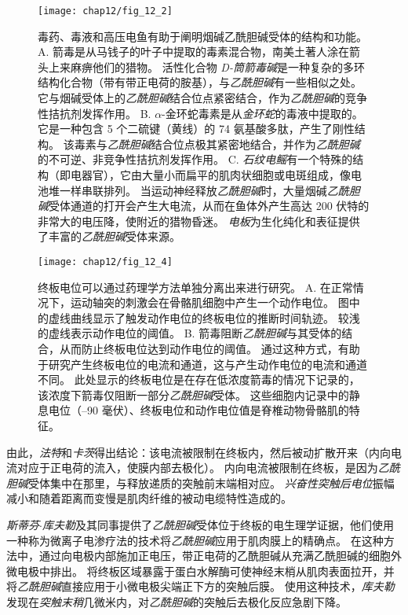 \begin{figure}[htbp]
	\centering
	\texttt{[image: chap12/fig\_12\_2]}
	\caption{毒药、毒液和高压电鱼有助于阐明烟碱乙酰胆碱受体的结构和功能。 
	A. 箭毒是从马钱子的叶子中提取的毒素混合物，南美土著人涂在箭头上来麻痹他们的猎物。
	活性化合物 \textit{D-筒箭毒碱}是一种复杂的多环结构化合物（带有带正电荷的胺基），与\textit{乙酰胆碱}有一些相似之处。
	它与烟碱受体上的\textit{乙酰胆碱}结合位点紧密结合，作为\textit{乙酰胆碱}的竞争性拮抗剂发挥作用。
	B. $\alpha$-金环蛇毒素是从\textit{金环蛇}的毒液中提取的。
	它是一种包含 5 个二硫键（黄线）的 74 氨基酸多肽，产生了刚性结构。
	该毒素与\textit{乙酰胆碱}结合位点极其紧密地结合，并作为\textit{乙酰胆碱}的不可逆、非竞争性拮抗剂发挥作用。
	C. \textit{石纹电鳐}有一个特殊的结构（即电器官），它由大量小而扁平的肌肉状细胞或电斑组成，像电池堆一样串联排列。
	当运动神经释放\textit{乙酰胆碱}时，大量烟碱\textit{乙酰胆碱}受体通道的打开会产生大电流，从而在鱼体外产生高达 200 伏特的非常大的电压降，使附近的猎物昏迷。
	\textit{电板}为生化纯化和表征提供了丰富的\textit{乙酰胆碱}受体来源\cite{torpedo_electric_property}。}
	\label{fig:12_2}
\end{figure}


\begin{figure}[htbp]
	\centering
	\texttt{[image: chap12/fig\_12\_4]}
	\caption{终板电位可以通过药理学方法单独分离出来进行研究。
		A. 在正常情况下，运动轴突的刺激会在骨骼肌细胞中产生一个动作电位。
		图中的虚线曲线显示了触发动作电位的终板电位的推断时间轨迹。
		较浅的虚线表示动作电位的阈值。
		B. 箭毒阻断\textit{乙酰胆碱}与其受体的结合，从而防止终板电位达到动作电位的阈值。
		通过这种方式，有助于研究产生终板电位的电流和通道，这与产生动作电位的电流和通道不同。
		此处显示的终板电位是在存在低浓度箭毒的情况下记录的，该浓度下箭毒仅阻断一部分\textit{乙酰胆碱}受体。
		这些细胞内记录中的静息电位（–90 毫伏）、终板电位和动作电位值是脊椎动物骨骼肌的特征。}
	\label{fig:12_4}
\end{figure}


由此，\textit{法特}和\textit{卡茨}得出结论：该电流被限制在终板内，然后被动扩散开来（内向电流对应于正电荷的流入，使膜内部去极化）。
内向电流被限制在终板，是因为\textit{乙酰胆碱}受体集中在那里，与释放递质的突触前末端相对应。
\textit{兴奋性突触后电位}振幅减小和随着距离而变慢是肌肉纤维的被动电缆特性造成的。


\textit{斯蒂芬$\cdot$库夫勒}及其同事提供了\textit{乙酰胆碱}受体位于终板的电生理学证据，他们使用一种称为微离子电渗疗法的技术将\textit{乙酰胆碱}应用于肌肉膜上的精确点。
在这种方法中，通过向电极内部施加正电压，带正电荷的乙酰胆碱从充满乙酰胆碱的细胞外微电极中排出。
将终板区域暴露于蛋白水解酶可使神经末梢从肌肉表面拉开，并将\textit{乙酰胆碱}直接应用于小微电极尖端正下方的突触后膜。
使用这种技术，\textit{库夫勒}发现在\textit{突触末稍}几微米内，对\textit{乙酰胆碱}的突触后去极化反应急剧下降。


